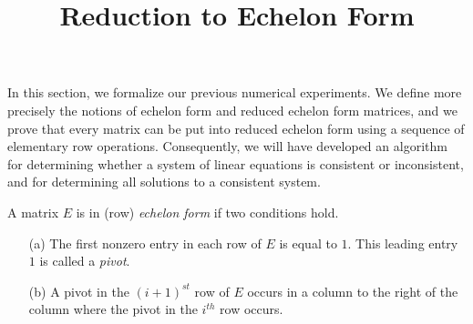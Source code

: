 \documentclass{ximera}
\title{Reduction to Echelon Form}
\begin{document}
\begin{abstract}
\end{abstract}
\maketitle


\label{S:2.4}

In this section, we formalize our previous numerical
experiments.  We define more precisely the notions of echelon
form and reduced echelon form matrices, and we prove that every
matrix can be put into reduced echelon form using a sequence of
elementary row operations.  Consequently, we will have developed
an algorithm for determining whether a system of linear
equations is consistent or inconsistent, and for determining all
solutions to a consistent system.

\begin{definition}
A matrix $E$ is in (row) {\em echelon form\/}  if two conditions hold.
\begin{enumerate}
\item[(a)] The first nonzero entry in each row of $E$ is equal
to $1$.  This leading entry $1$ is called a {\em pivot\/}. 
\item[(b)] A pivot in the $(i+1)^{st}$ row of $E$ occurs in a column to
the right of the column where the pivot in the $i^{th}$ row occurs.
\end{enumerate}
\end{definition}
\end{document}
